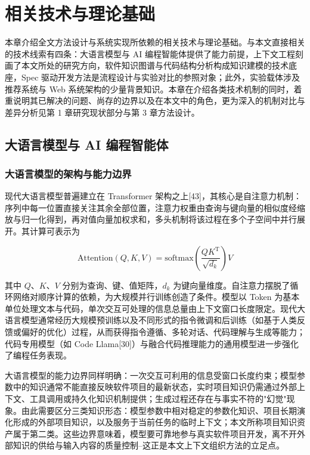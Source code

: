 \chapter{相关技术与理论基础}

本章介绍全文方法设计与系统实现所依赖的相关技术与理论基础。与本文直接相关的技术线索有四条：大语言模型与 AI 编程智能体提供了能力前提，上下文工程刻画了本文所处的研究方向，软件知识图谱与代码结构分析构成知识建模的技术底座，Spec 驱动开发方法是流程设计与实验对比的参照对象；此外，实验载体涉及推荐系统与 Web 系统架构的少量背景知识。本章在介绍各类技术机制的同时，着重说明其已解决的问题、尚存的边界以及在本文中的角色，更为深入的机制对比与差异分析见第 1 章研究现状部分与第 3 章方法设计。


\section{大语言模型与 AI 编程智能体}

\subsection{大语言模型的架构与能力边界}
现代大语言模型普遍建立在 Transformer 架构之上[43]，其核心是自注意力机制：序列中每一位置直接关注其余全部位置，注意力权重由查询与键向量的相似度经缩放与归一化得到，再对值向量加权求和，多头机制将该过程在多个子空间中并行展开。其计算可表示为

\begin{equation}
\mathrm{Attention}(Q, K, V) = \mathrm{softmax}\left(\frac{QK^{\mathrm{T}}}{\sqrt{d_k}}\right)V \tag{2-1}
\end{equation}

其中 $Q$、$K$、$V$ 分别为查询、键、值矩阵，$d_k$ 为键向量维度。自注意力摆脱了循环网络对顺序计算的依赖，为大规模并行训练创造了条件。模型以 Token 为基本单位处理文本与代码，单次交互可处理的信息总量由上下文窗口长度限定。现代大语言模型通常经历大规模预训练以及不同形式的指令微调和后训练（如基于人类反馈或偏好的优化）过程，从而获得指令遵循、多轮对话、代码理解与生成等能力；代码专用模型（如 Code Llama[30]）与融合代码推理能力的通用模型进一步强化了编程任务表现。

大语言模型的能力边界同样明确：一次交互可利用的信息受窗口长度约束；模型参数中的知识通常不能直接反映软件项目的最新状态，实时项目知识仍需通过外部上下文、工具调用或持久化知识机制提供；生成过程还存在与事实不符的"幻觉"现象。由此需要区分三类知识形态：模型参数中相对稳定的参数化知识、项目长期演化形成的外部项目知识，以及服务于当前任务的临时上下文；本文所称项目知识资产属于第二类。这些边界意味着，模型要可靠地参与真实软件项目开发，离不开外部知识的供给与输入内容的质量控制--这正是本文上下文组织方法的立足点。


